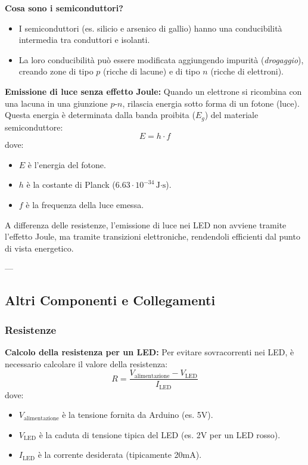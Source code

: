 \documentclass[a4paper,12pt]{report}
\begin{document}
\textbf{Cosa sono i semiconduttori?}
\begin{itemize}
    \item I semiconduttori (es. silicio e arsenico di gallio) hanno una conducibilità intermedia tra conduttori e isolanti.
    \item La loro conducibilità può essere modificata aggiungendo impurità (\textit{drogaggio}), creando zone di tipo \(p\) (ricche di lacune) e di tipo \(n\) (ricche di elettroni).
\end{itemize}

\textbf{Emissione di luce senza effetto Joule:}
Quando un elettrone si ricombina con una lacuna in una giunzione \(p\)-\(n\), rilascia energia sotto forma di un fotone (luce). Questa energia è determinata dalla banda proibita (\(E_g\)) del materiale semiconduttore:
\[
E = h \cdot f
\]
dove:
\begin{itemize}
    \item \(E\) è l'energia del fotone.
    \item \(h\) è la costante di Planck (\(6.63 \cdot 10^{-34} \, \text{J·s}\)).
    \item \(f\) è la frequenza della luce emessa.
\end{itemize}

A differenza delle resistenze, l'emissione di luce nei LED non avviene tramite l'effetto Joule, ma tramite transizioni elettroniche, rendendoli efficienti dal punto di vista energetico.

---

\subsection{Altri Componenti e Collegamenti}
\subsubsection{Resistenze}
\textbf{Calcolo della resistenza per un LED:}
Per evitare sovracorrenti nei LED, è necessario calcolare il valore della resistenza:
\[
R = \frac{V_{\text{alimentazione}} - V_{\text{LED}}}{I_{\text{LED}}}
\]
dove:
\begin{itemize}
    \item \(V_{\text{alimentazione}}\) è la tensione fornita da Arduino (es. 5V).
    \item \(V_{\text{LED}}\) è la caduta di tensione tipica del LED (es. 2V per un LED rosso).
    \item \(I_{\text{LED}}\) è la corrente desiderata (tipicamente 20mA).
\end{itemize}
\end{document}
